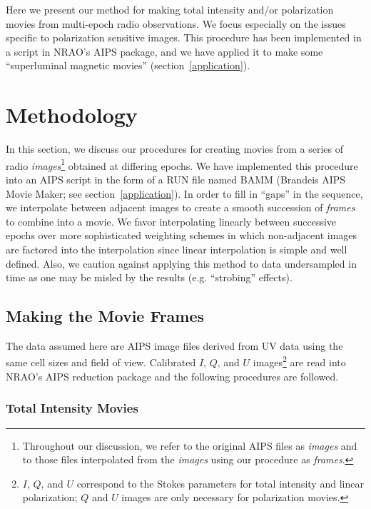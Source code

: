 \documentclass[twoside]{article}
\begin{document}
Here we present our method for making total intensity and/or polarization
movies from multi-epoch radio observations. We focus especially on the
issues specific to polarization sensitive images.  This procedure has been
implemented in a script in NRAO's AIPS package, and we have applied it to
make some ``superluminal magnetic movies'' (section~\ref{application}).

\section{Methodology}

In this section, we discuss our procedures for creating movies from a
series of radio {\it images}\footnote{Throughout our discussion, we refer
to the original AIPS files as {\it images} and to those files interpolated
from the {\it images} using our procedure as {\it frames}.} obtained at
differing epochs. We have implemented this procedure into an AIPS script
in the form of a RUN file named BAMM (Brandeis AIPS Movie Maker; see
section~\ref{application}).  In order to fill in ``gaps'' in the sequence,
we interpolate between adjacent images to create a smooth succession of
{\it frames} to combine into a movie. We favor interpolating linearly
between successive epochs over more sophisticated weighting schemes in
which non-adjacent images are factored into the interpolation since linear
interpolation is simple and well defined. Also, we caution against
applying this method to data undersampled in time as one may be misled by
the results (e.g.  ``strobing'' effects).

\subsection{Making the Movie Frames}

The data assumed here are AIPS image files derived from UV data using the
same cell sizes and field of view. Calibrated $I$, $Q$, and $U$
images\footnote{$I$, $Q$, and $U$ correspond to the Stokes parameters for
total intensity and linear polarization; $Q$ and $U$ images are only
necessary for polarization movies.} are read into NRAO's AIPS reduction
package and the following procedures are followed.

\subsubsection{Total Intensity Movies}
\label{imovie}
\end{document}
